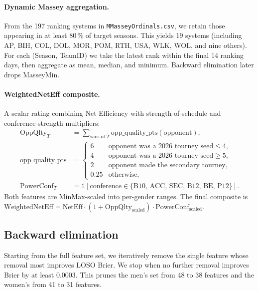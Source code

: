 \documentclass[11pt, a4paper]{article}
\begin{document}
\paragraph{Dynamic Massey aggregation.} From the 197 ranking systems in \texttt{MMasseyOrdinals.csv}, we retain those appearing in at least 80\,\% of target seasons. This yields 19 systems (including AP, BIH, COL, DOL, MOR, POM, RTH, USA, WLK, WOL, and nine others). For each (Season, TeamID) we take the latest rank within the final 14 ranking days, then aggregate as mean, median, and minimum. Backward elimination later drops MasseyMin.

\paragraph{WeightedNetEff composite.} A scalar rating combining Net Efficiency with strength-of-schedule and conference-strength multipliers:
\begin{align}
    \text{OppQlty}_T &= \sum_{\text{wins of }T} \text{opp\_quality\_pts}(\text{opponent}), \\[2pt]
    \text{opp\_quality\_pts} &= \begin{cases}
        6 & \text{opponent was a 2026 tourney seed} \leq 4, \\
        4 & \text{opponent was a 2026 tourney seed} \geq 5, \\
        2 & \text{opponent made the secondary tourney}, \\
        0.25 & \text{otherwise},
    \end{cases} \\[2pt]
    \text{PowerConf}_T &= \mathbb{1}[\text{conference} \in \{\text{B10, ACC, SEC, B12, BE, P12}\}].
\end{align}
Both features are MinMax-scaled into per-gender ranges. The final composite is $\text{WeightedNetEff} = \text{NetEff} \cdot (1 + \text{OppQlty}_{\text{scaled}}) \cdot \text{PowerConf}_{\text{scaled}}$.

\subsection{Backward elimination}

Starting from the full feature set, we iteratively remove the single feature whose removal most improves LOSO Brier. We stop when no further removal improves Brier by at least $0.0003$. This prunes the men's set from 48 to 38 features and the women's from 41 to 31 features.
\end{document}
